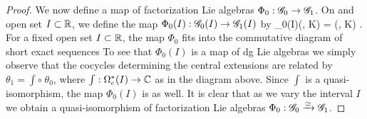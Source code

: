 \documentclass[10pt]{amsart}
\begin{document}
\begin{proof}
\def\dR{{\rm dR}}

We now define a map of factorization Lie algebras $\Phi_0 : \mathscr G_0 \to \mathscr G_1$. On and open set $I \subset \mathbb R$, we define the map $\Phi_0(I) : \mathscr G_0(I) \to \mathscr G_1(I)$ by
\ben
\Phi_0(I)(\varphi \alpha, \psi K) = \left(\varphi \alpha, \int \psi \cdot K\right) .
\een
For a fixed open set $I \subset \mathbb R$, the map $\Phi_0$ fits into the commutative diagram of short exact sequences
\ben
{}
\een
To see that $\Phi_0(I)$ is a map of dg Lie algebras we simply observe that the cocycles determining the central extensions are related by $\theta_1 = \int \circ \; \theta_0$, where $\int : \Omega^*_c(I) \to \mathbb C$ as in the diagram above. Since $\int$ is a quasi-isomorphism, the map $\Phi_0(I)$ is as well. It is clear that as we vary the interval $I$ we obtain a quasi-isomorphism of factorization Lie algebras $\Phi_0 : \mathscr G_0 \xrightarrow{\simeq} \mathscr G_1$. 



\end{proof}
\end{document}
